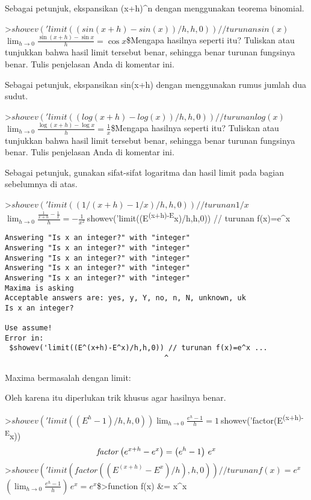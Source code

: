 \documentclass[
]{book}
\begin{document}
Sebagai petunjuk, ekspansikan (x+h)\^{}n dengan menggunakan teorema binomial.

\textgreater{}\(showev('limit((sin(x+h)-sin(x))/h,h,0)) // turunan sin(x)\)\(\lim_{h\rightarrow 0}{\frac{\sin \left(x+h\right)-\sin x}{h}}=\cos   x\)\$Mengapa hasilnya seperti itu? Tuliskan atau tunjukkan bahwa hasil limit tersebut benar, sehingga benar turunan fungsinya benar. Tulis penjelasan Anda di komentar ini.

Sebagai petunjuk, ekspansikan sin(x+h) dengan menggunakan rumus jumlah dua sudut.

\textgreater{}\(showev('limit((log(x+h)-log(x))/h,h,0)) // turunan log(x)\)\(\lim_{h\rightarrow 0}{\frac{\log \left(x+h\right)-\log x}{h}}=  \frac{1}{x}\)\$Mengapa hasilnya seperti itu? Tuliskan atau tunjukkan bahwa hasil limit tersebut benar, sehingga benar turunan fungsinya benar. Tulis penjelasan Anda di komentar ini.

Sebagai petunjuk, gunakan sifat-sifat logaritma dan hasil limit pada bagian sebelumnya di atas.

\textgreater{}\(showev('limit((1/(x+h)-1/x)/h,h,0)) // turunan 1/x\)\(\lim_{h\rightarrow 0}{\frac{\frac{1}{x+h}-\frac{1}{x}}{h}}=-\frac{1  }{x^2}\)\(\>\)showev('limit((E\textsuperscript{(x+h)-E}x)/h,h,0)) // turunan f(x)=e\^{}x

\begin{verbatim}
Answering "Is x an integer?" with "integer"
Answering "Is x an integer?" with "integer"
Answering "Is x an integer?" with "integer"
Answering "Is x an integer?" with "integer"
Answering "Is x an integer?" with "integer"
Maxima is asking
Acceptable answers are: yes, y, Y, no, n, N, unknown, uk
Is x an integer?

Use assume!
Error in:
 $showev('limit((E^(x+h)-E^x)/h,h,0)) // turunan f(x)=e^x ...
                                     ^
\end{verbatim}

Maxima bermasalah dengan limit:

Oleh karena itu diperlukan trik khusus agar hasilnya benar.

\textgreater{}\(showev('limit((E^h-1)/h,h,0))\)\(\lim_{h\rightarrow 0}{\frac{e^{h}-1}{h}}=1\)\(\>\)showev('factor(E\textsuperscript{(x+h)-E}x)) \[{\it factor}\left(e^{x+h}-e^{x}\right)=\left(e^{h}-1\right)\,e^{x}\]\textgreater{}\(showev('limit(factor((E^(x+h)-E^x)/h),h,0)) // turunan f(x)=e^x\)\(\left(\lim_{h\rightarrow 0}{\frac{e^{h}-1}{h}}\right)\,e^{x}=e^{x}\)\$\textgreater function f(x) \&= x\^{}x
\end{document}
